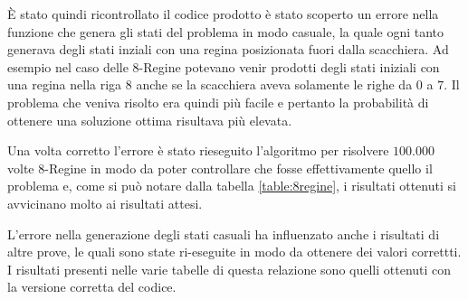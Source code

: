 \`{E} stato quindi ricontrollato il codice prodotto è stato scoperto un errore nella funzione che genera gli stati del problema in modo casuale, la quale ogni tanto generava degli stati inziali con una regina posizionata fuori dalla scacchiera. 
Ad esempio nel caso delle $8$-Regine potevano venir prodotti degli stati iniziali con una regina nella riga $8$ anche se la scacchiera aveva solamente le righe da $0$ a $7$.
Il problema che veniva risolto era quindi più facile e pertanto la probabilità di ottenere una soluzione ottima risultava più elevata.

Una volta corretto l'errore è stato rieseguito l'algoritmo per risolvere $100.000$ volte $8$-Regine in modo da poter controllare che fosse effettivamente quello il problema e, come si può notare dalla tabella \ref{table:8regine}, i risultati ottenuti si avvicinano molto ai risultati attesi.

L'errore nella generazione degli stati casuali ha influenzato anche i risultati di altre prove, le quali sono state ri-eseguite in modo da ottenere dei valori correttti. I risultati presenti nelle varie tabelle di questa relazione sono quelli ottenuti con la versione corretta del codice.

\begin{table}[]
\centering
{}
\caption{8-Regine: confronto tra i dati errati, quelli corretti e quelli attesi.}
\label{table:8regine}
\end{table}

